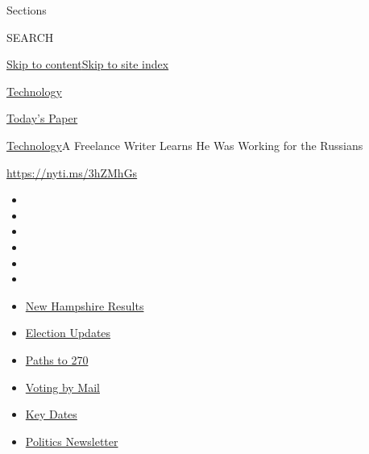Sections

SEARCH

\protect\hyperlink{site-content}{Skip to
content}\protect\hyperlink{site-index}{Skip to site index}

\href{https://www.nytimes3xbfgragh.onion/section/technology}{Technology}

\href{https://myaccount.nytimes3xbfgragh.onion/auth/login?response_type=cookie\&client_id=vi}{}

\href{https://www.nytimes3xbfgragh.onion/section/todayspaper}{Today's
Paper}

\href{/section/technology}{Technology}\textbar{}A Freelance Writer
Learns He Was Working for the Russians

\url{https://nyti.ms/3hZMhGs}

\begin{itemize}
\item
\item
\item
\item
\item
\item
\end{itemize}

\begin{itemize}
\item
  \href{https://www.nytimes3xbfgragh.onion/interactive/2020/09/08/us/elections/results-new-hampshire-primary-elections.html?action=click\&pgtype=Article\&state=default\&region=TOP_BANNER\&context=storylines_menu}{New
  Hampshire Results}
\item
  \href{https://www.nytimes3xbfgragh.onion/live/2020/09/08/us/trump-vs-biden?action=click\&pgtype=Article\&state=default\&region=TOP_BANNER\&context=storylines_menu}{Election
  Updates}
\item
  \href{https://www.nytimes3xbfgragh.onion/interactive/2020/us/elections/election-states-biden-trump.html?action=click\&pgtype=Article\&state=default\&region=TOP_BANNER\&context=storylines_menu}{Paths
  to 270}
\item
  \href{https://www.nytimes3xbfgragh.onion/interactive/2020/08/31/us/politics/vote-by-mail-deadlines.html?action=click\&pgtype=Article\&state=default\&region=TOP_BANNER\&context=storylines_menu}{Voting
  by Mail}
\item
  \href{https://www.nytimes3xbfgragh.onion/interactive/2019/us/elections/2020-presidential-election-calendar.html?action=click\&pgtype=Article\&state=default\&region=TOP_BANNER\&context=storylines_menu}{Key
  Dates}
\item
  \href{https://www.nytimes3xbfgragh.onion/newsletters/politics?action=click\&pgtype=Article\&state=default\&region=TOP_BANNER\&context=storylines_menu}{Politics
  Newsletter}
\end{itemize}

